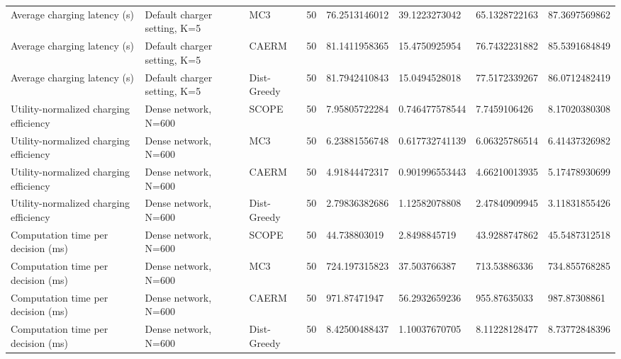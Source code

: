 \begin{table}[t]
\begin{tabular}{llllllll}
Average charging latency (s) & Default charger setting, K=5 & MC3 & 50 & 76.2513146012 & 39.1223273042 & 65.1328722163 & 87.3697569862 \\
Average charging latency (s) & Default charger setting, K=5 & CAERM & 50 & 81.1411958365 & 15.4750925954 & 76.7432231882 & 85.5391684849 \\
Average charging latency (s) & Default charger setting, K=5 & Dist-Greedy & 50 & 81.7942410843 & 15.0494528018 & 77.5172339267 & 86.0712482419 \\
Utility-normalized charging efficiency & Dense network, N=600 & SCOPE & 50 & 7.95805722284 & 0.746477578544 & 7.7459106426 & 8.17020380308 \\
Utility-normalized charging efficiency & Dense network, N=600 & MC3 & 50 & 6.23881556748 & 0.617732741139 & 6.06325786514 & 6.41437326982 \\
Utility-normalized charging efficiency & Dense network, N=600 & CAERM & 50 & 4.91844472317 & 0.901996553443 & 4.66210013935 & 5.17478930699 \\
Utility-normalized charging efficiency & Dense network, N=600 & Dist-Greedy & 50 & 2.79836382686 & 1.12582078808 & 2.47840909945 & 3.11831855426 \\
Computation time per decision (ms) & Dense network, N=600 & SCOPE & 50 & 44.738803019 & 2.8498845719 & 43.9288747862 & 45.5487312518 \\
Computation time per decision (ms) & Dense network, N=600 & MC3 & 50 & 724.197315823 & 37.503766387 & 713.53886336 & 734.855768285 \\
Computation time per decision (ms) & Dense network, N=600 & CAERM & 50 & 971.87471947 & 56.2932659236 & 955.87635033 & 987.87308861 \\
Computation time per decision (ms) & Dense network, N=600 & Dist-Greedy & 50 & 8.42500488437 & 1.10037670705 & 8.11228128477 & 8.73772848396 \\
\hline
\end{tabular}
\end{table}
